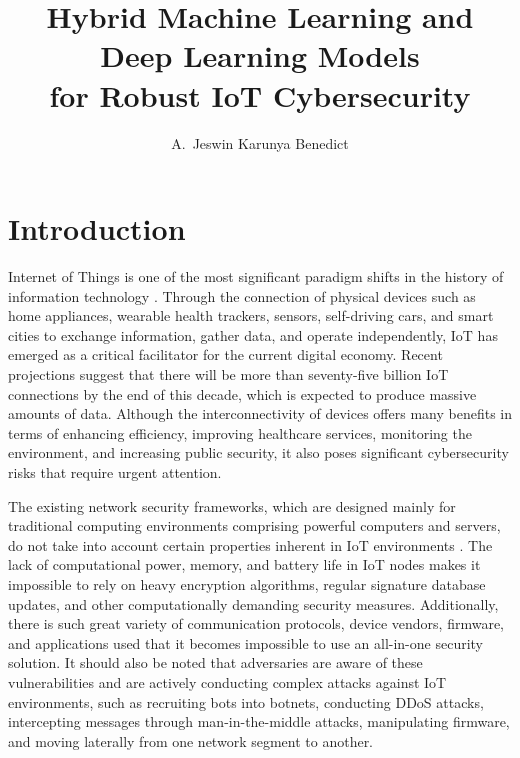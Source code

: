 \documentclass[12pt]{article}
\title{Hybrid Machine Learning and Deep Learning Models\\for Robust IoT Cybersecurity}
\author{A.~Jeswin Karunya Benedict}
\date{}
\begin{document}
\maketitle



\section{Introduction}

Internet of Things is one of the most significant paradigm shifts in the history of information technology \cite{al2015internet}. Through the connection of physical devices such as home appliances, wearable health trackers, sensors, self-driving cars, and smart cities to exchange information, gather data, and operate independently, IoT has emerged as a critical facilitator for the current digital economy. Recent projections suggest that there will be more than seventy-five billion IoT connections by the end of this decade, which is expected to produce massive amounts of data. Although the interconnectivity of devices offers many benefits in terms of enhancing efficiency, improving healthcare services, monitoring the environment, and increasing public security, it also poses significant cybersecurity risks that require urgent attention.

The existing network security frameworks, which are designed mainly for traditional computing environments comprising powerful computers and servers, do not take into account certain properties inherent in IoT environments \cite{alaba2017internet}. The lack of computational power, memory, and battery life in IoT nodes makes it impossible to rely on heavy encryption algorithms, regular signature database updates, and other computationally demanding security measures. Additionally, there is such great variety of communication protocols, device vendors, firmware, and applications used that it becomes impossible to use an all-in-one security solution. It should also be noted that adversaries are aware of these vulnerabilities and are actively conducting complex attacks against IoT environments, such as recruiting bots into botnets, conducting DDoS attacks, intercepting messages through man-in-the-middle attacks, manipulating firmware, and moving laterally from one network segment to another.
\end{document}
